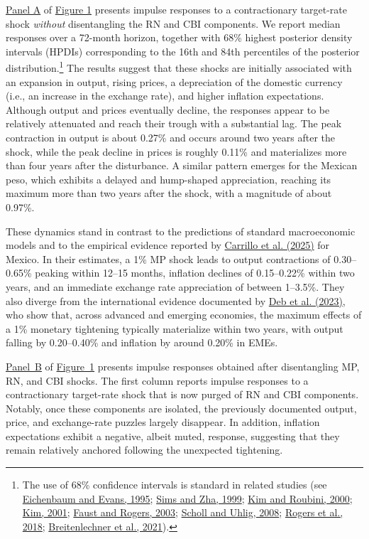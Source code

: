 \documentclass[12pt, reqno]{article}
\begin{document}
\hyperlink{Panel BF1}{Panel A} of \hyperlink{Figure 1}{Figure 1} presents impulse responses to a contractionary target-rate shock \emph{without} disentangling the RN and CBI components. We report median responses over a 72-month horizon, together with 68\% highest posterior density intervals (HPDIs) corresponding to the 16th and 84th percentiles of the posterior distribution.\footnote{The use of 68\% confidence intervals is standard in related studies (see \hyperlink{Eichenbaum and Evans (1995)}{Eichenbaum and Evans, 1995}; \hyperlink{Sims and Zha (1999)}{Sims and Zha, 1999}; \hyperlink{Kim and Roubini (2000)}{Kim and Roubini, 2000}; \hyperlink{Kim (2001)}{Kim, 2001}; \hyperlink{Faust and Rogers (2003)}{Faust and Rogers, 2003}; \hyperlink{Scholl and Uhlig (2008)}{Scholl and Uhlig, 2008}; \hyperlink{Rogers et al. (2018)}{Rogers et al., 2018}; \hyperlink{Breitenlechner et al. (2021)}{Breitenlechner et al., 2021}).}   The results suggest that these shocks are initially associated with an expansion in output, rising prices, a depreciation of the domestic currency (i.e., an increase in the exchange rate), and higher inflation expectations. Although output and prices eventually decline, the responses appear to be relatively attenuated and reach their trough with a substantial lag. The peak contraction in output is about 0.27\% and occurs around two years after the shock, while the peak decline in prices is roughly 0.11\% and materializes more than four years after the disturbance. A similar pattern emerges for the Mexican peso, which exhibits a delayed and hump-shaped appreciation, reaching its maximum more than two years after the shock, with a magnitude of about 0.97\%.

These dynamics stand in contrast to the predictions of standard macroeconomic models and to the empirical evidence reported by \hyperlink{Carrillo et al. (2025)}{Carrillo et al. (2025)} for Mexico. In their estimates, a 1\% MP shock leads to output contractions of 0.30--0.65\% peaking within 12--15 months, inflation declines of 0.15--0.22\% within two years, and an immediate exchange rate appreciation of between 1--3.5\%. They also diverge from the international evidence documented by \hyperlink{Deb et al. (2023)}{Deb et al. (2023)}, who show that, across advanced and emerging economies, the maximum effects of a 1\% monetary tightening typically materialize within two years, with output falling by 0.20--0.40\% and inflation by around 0.20\% in EMEs.


\hyperlink{Panel BF1}{Panel~B} of \hyperlink{Figure~1}{Figure~1} presents impulse responses obtained after disentangling MP, RN, and CBI shocks. The first column reports impulse responses to a contractionary target-rate shock that is now purged of RN and CBI components. Notably, once these components are isolated, the previously documented output, price, and exchange-rate puzzles largely disappear. In addition, inflation expectations exhibit a negative, albeit muted, response, suggesting that they remain relatively anchored following the unexpected tightening. 
\end{document}

